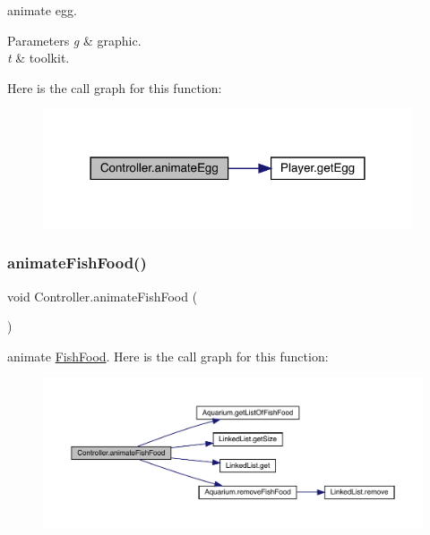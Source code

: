 animate egg. 
\begin{DoxyParams}{Parameters}
{\em g} & graphic. \\
\hline
{\em t} & toolkit. \\
\hline
\end{DoxyParams}
Here is the call graph for this function\+:
\nopagebreak
\begin{figure}[H]
\begin{center}
\leavevmode
\includegraphics[width=309pt]{class_controller_a04e239635c1b5ca996b74498c373626b_cgraph}
\end{center}
\end{figure}
\mbox{\label{class_controller_ac9f6dcbe9113ca383adf751261c2a8d3}} 
\subsubsection{\texorpdfstring{animate\+Fish\+Food()}{animateFishFood()}}
{\footnotesize\ttfamily void Controller.\+animate\+Fish\+Food (\begin{DoxyParamCaption}{ }\end{DoxyParamCaption})\hspace{0.3cm}{\ttfamily [inline]}}

animate \mbox{\hyperlink{class_fish_food}{Fish\+Food}}. Here is the call graph for this function\+:
\nopagebreak
\begin{figure}[H]
\begin{center}
\leavevmode
\includegraphics[width=350pt]{class_controller_ac9f6dcbe9113ca383adf751261c2a8d3_cgraph}
\end{center}
\end{figure}
\mbox{\label{class_controller_ac950a5d811e4f3d266e8952e0140faa0}} 
